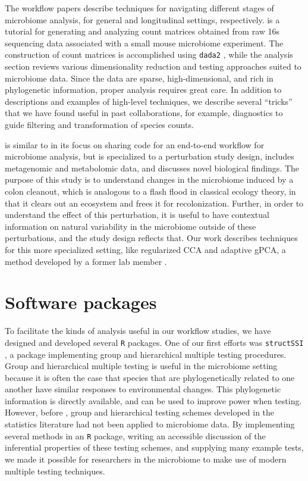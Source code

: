 \documentclass{article}
\begin{document}
The workflow papers \citep{Callahan2016, Fukuyama2017} describe techniques for
navigating different stages of microbiome analysis, for general and longitudinal
settings, respectively. \cite{Callahan2016} is a tutorial for generating and
analyzing count matrices obtained from raw 16s sequencing data associated with a
small mouse microbiome experiment. The construction of count matrices is
accomplished using \texttt{dada2} \citep{callahan2016dada2}, while the analysis
section reviews various dimensionality reduction and testing approaches suited
to microbiome data. Since the data are sparse, high-dimensional, and rich in
phylogenetic information, proper analysis requires great care. In addition to
descriptions and examples of high-level techniques, we describe several
``tricks'' that we have found useful in past collaborations, for example,
diagnostics to guide filtering and transformation of species counts.

\cite{Fukuyama2017} is similar to \cite{Callahan2016} in its focus on sharing
code for an end-to-end workflow for microbiome analysis, but is specialized to a
perturbation study design, includes metagenomic and metabolomic data, and
discusses novel biological findings. The purpose of this study is to understand
changes in the microbiome induced by a colon cleanout, which is analogous to a
flash flood in classical ecology theory, in that it clears out an ecosystem and
frees it for recolonization. Further, in order to understand the effect of this
perturbation, it is useful to have contextual information on natural variability
in the microbiome outside of these perturbations, and the study design reflects
that. Our work describes techniques for this more specialized setting, like
regularized CCA and adaptive gPCA, a method developed by a former lab member
\citep{fukuyama2017adaptive}.

\section{Software packages}

To facilitate the kinds of analysis useful in our workflow studies, we have
designed and developed several \texttt{R} packages. One of our first efforts was
\texttt{structSSI} \citep{sankaran2014structssi}, a package implementing group
and hierarchical multiple testing procedures. Group and hierarchical multiple
testing is useful in the microbiome setting because it is often the case that
species that are phylogenetically related to one another have similar responses
to environmental changes. This phylogenetic information is directly available,
and can be used to improve power when testing. However, before
\citep{sankaran2014structssi}, group and hierarchical testing schemes developed
in the statistics literature had not been applied to microbiome data. By
implementing several methods in an \texttt{R} package, writing an accessible
discussion of the inferential properties of these testing schemes, and supplying
many example tests, we made it possible for researchers in the microbiome to
make use of modern multiple testing techniques.
\end{document}
